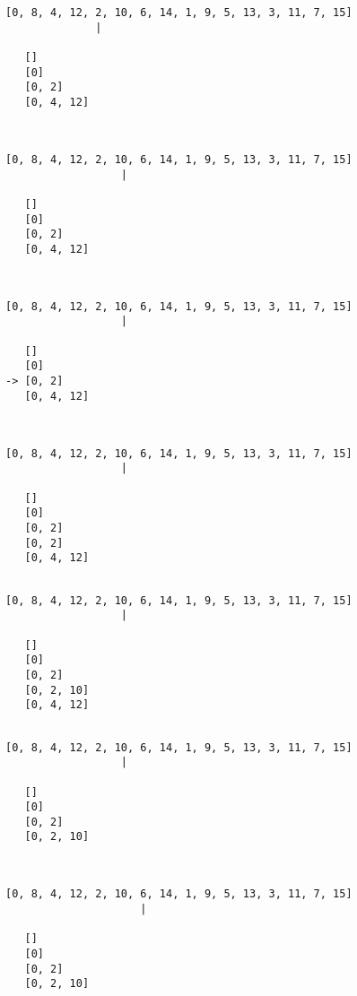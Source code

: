 { \begin{verbatim}
[0, 8, 4, 12, 2, 10, 6, 14, 1, 9, 5, 13, 3, 11, 7, 15]
              |

   []
   [0]
   [0, 2]
   [0, 4, 12]



\end{verbatim} }

{ \begin{verbatim}
[0, 8, 4, 12, 2, 10, 6, 14, 1, 9, 5, 13, 3, 11, 7, 15]
                  |

   []
   [0]
   [0, 2]
   [0, 4, 12]



\end{verbatim} }

{ \begin{verbatim}
[0, 8, 4, 12, 2, 10, 6, 14, 1, 9, 5, 13, 3, 11, 7, 15]
                  |

   []
   [0]
-> [0, 2]
   [0, 4, 12]



\end{verbatim} }

{ \begin{verbatim}
[0, 8, 4, 12, 2, 10, 6, 14, 1, 9, 5, 13, 3, 11, 7, 15]
                  |

   []
   [0]
   [0, 2]
   [0, 2]
   [0, 4, 12]


\end{verbatim} }

{ \begin{verbatim}
[0, 8, 4, 12, 2, 10, 6, 14, 1, 9, 5, 13, 3, 11, 7, 15]
                  |

   []
   [0]
   [0, 2]
   [0, 2, 10]
   [0, 4, 12]


\end{verbatim} }

{ \begin{verbatim}
[0, 8, 4, 12, 2, 10, 6, 14, 1, 9, 5, 13, 3, 11, 7, 15]
                  |

   []
   [0]
   [0, 2]
   [0, 2, 10]



\end{verbatim} }

{ \begin{verbatim}
[0, 8, 4, 12, 2, 10, 6, 14, 1, 9, 5, 13, 3, 11, 7, 15]
                     |

   []
   [0]
   [0, 2]
   [0, 2, 10]



\end{verbatim} }

